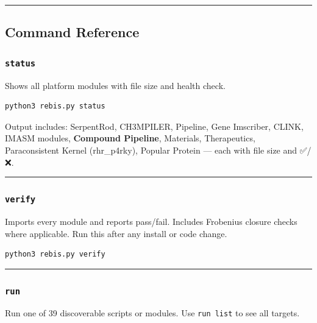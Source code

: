 \documentclass[12pt,a4paper]{article}
\begin{document}
\begin{center}\rule{0.5\linewidth}{0.5pt}\end{center}

\hypertarget{command-reference}{%
\subsection{Command Reference}\label{command-reference}}

\hypertarget{status}{%
\subsubsection{\texorpdfstring{\texttt{status}}{status}}\label{status}}

Shows all platform modules with file size and health check.

\begin{verbatim}
python3 rebis.py status
\end{verbatim}

Output includes: SerpentRod, CH3MPILER, Pipeline, Gene Imscriber, CLINK,
IMASM modules, \textbf{Compound Pipeline}, Materials, Therapeutics,
Paraconsistent Kernel (rhr\_p4rky), Popular Protein --- each with file
size and ✅/❌.

\begin{center}\rule{0.5\linewidth}{0.5pt}\end{center}

\hypertarget{verify}{%
\subsubsection{\texorpdfstring{\texttt{verify}}{verify}}\label{verify}}

Imports every module and reports pass/fail. Includes Frobenius closure
checks where applicable. Run this after any install or code change.

\begin{verbatim}
python3 rebis.py verify
\end{verbatim}

\begin{center}\rule{0.5\linewidth}{0.5pt}\end{center}

\hypertarget{run}{%
\subsubsection{\texorpdfstring{\texttt{run}}{run}}\label{run}}

Run one of 39 discoverable scripts or modules. Use \texttt{run\ list} to
see all targets.
\end{document}
